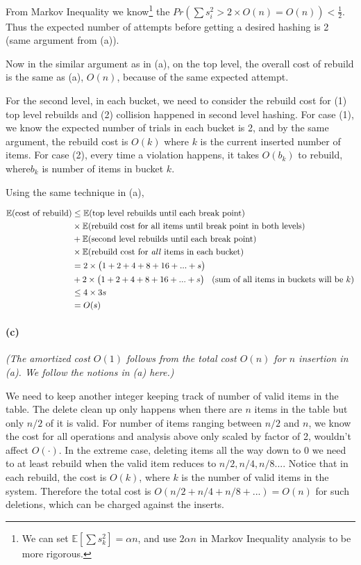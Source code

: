 \documentclass[12pt]{article}
\begin{document}
From Markov Inequality we know\footnote{We can set $\mathbb{E}\left[\sum s_k^2\right] = \alpha n$, and use $2\alpha n$ in Markov Inequality analysis to be more rigorous.} the $Pr(\sum s_i^2 > 2 \times O(n) = O(n)) < \frac{1}{2}$. Thus the expected number of attempts before getting a desired hashing is 2 (same argument from (a)).

Now in the similar argument as in (a), on the top level, the overall cost of rebuild is the same as (a), $O(n)$, because of the same expected attempt. 

For the second level, in each bucket, we need to consider the rebuild cost for (1) top level rebuilds and (2) collision happened in second level hashing. For case (1), we know the expected number of trials in each bucket is 2, and by the same argument, the rebuild cost is $O(k)$ where $k$ is the current inserted number of items. For case (2), every time a violation happens, it takes $O(b_k)$ to rebuild, where$b_k$ is number of items in bucket $k$. 

Using the same technique in (a), 

\begin{align*}
\mathbb{E} (\text{cost of rebuild}) &\leq \mathbb{E} (\text{top level rebuilds until each break point}) \\
& \times \mathbb{E}(\text{rebuild cost for all items until break point in both levels}) \\
&+ \mathbb{E} (\text{second level rebuilds until each break point}) \\
& \times \mathbb{E}(\text{rebuild cost for \emph{all} items in each bucket}) \\
& = 2 \times \big(1 + 2 + 4 + 8 + 16 + ... + s\big)\\
& + 2 \times \big(1 + 2 + 4 + 8 + 16 + ... + s\big) \:\:\:\: (\text{sum of all items in buckets will be $k$})\\
& \leq 4 \times 3s \\
& = O(s) 
\end{align*} 

\paragraph{(c)}
\emph{(The amortized cost $O(1)$ follows from the total cost $O(n)$ for $n$ insertion in (a). We follow the notions in (a) here.)} 

We need to keep another integer keeping track of number of valid items in the table. The delete clean up only happens when there are $n$ items in the table but only $n/2$ of it is valid. For number of items ranging between $n/2$ and $n$, we know the cost for all operations and analysis above only scaled by factor of 2, wouldn't affect $O(\cdot)$. In the extreme case, deleting items all the way down to 0 we need to at least rebuild when the valid item reduces to $n/2, n/4, n/8...$. Notice that in each rebuild, the cost is $O(k)$, where $k$ is the number of valid items in the system. Therefore the total cost is $O(n/2 + n/4 + n/8 + ...) = O(n)$ for such deletions, which can be charged against the inserts.
\end{document}
